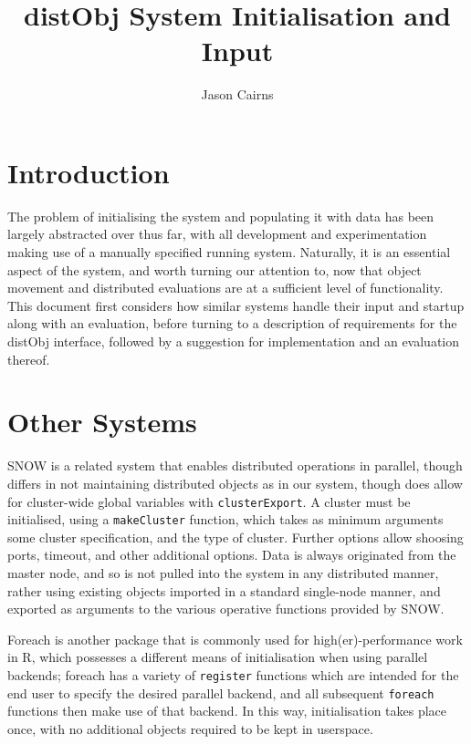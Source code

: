 \documentclass[a4paper,10pt]{article}
\begin{document}
\title{distObj System Initialisation and Input}
\author{Jason Cairns}
  
\maketitle{}

\section{Introduction}

The problem of initialising the system and populating it with data has been
largely abstracted over thus far, with all development and experimentation
making use of a manually specified running system.
Naturally, it is an essential aspect of the system, and worth turning our
attention to, now that object movement and distributed evaluations are at a
sufficient level of functionality.
This document first considers how similar systems handle their input and
startup along with an evaluation, before turning to a description of
requirements for the distObj interface, followed by a suggestion for
implementation and an evaluation thereof.


\section{Other Systems}

SNOW is a related system that enables distributed operations in parallel,
though differs in not maintaining distributed objects as in our system, though
does allow for cluster-wide global variables with
\texttt{clusterExport}\cite{tierney18}.
A cluster must be initialised, using a \texttt{makeCluster} function,
which takes as minimum arguments some cluster specification, and the type of
cluster.
Further options allow shoosing ports, timeout, and other additional options.
Data is always originated from the master node, and so is not pulled into the
system in any distributed manner, rather using existing objects imported in a
standard single-node manner, and exported as arguments to the various operative
functions provided by SNOW.

Foreach is another package that is commonly used for high(er)-performance work
in R, which possesses a different means of initialisation when using parallel
backends; foreach has a variety of \texttt{register} functions which are
intended for the end user to specify the desired parallel backend, and all
subsequent \texttt{foreach} functions then make use of that
backend\cite{microsoft20}\cite{corporation19}.
In this way, initialisation takes place once, with no additional objects
required to be kept in userspace.
\end{document}
